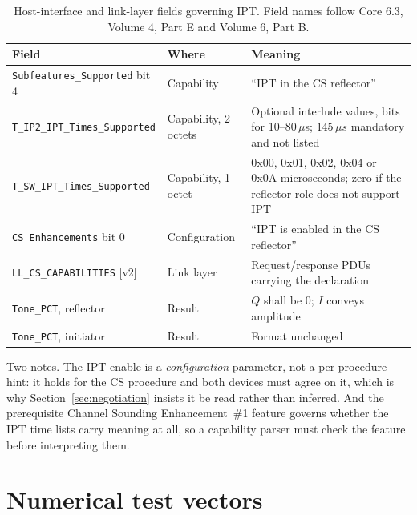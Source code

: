 \documentclass[11pt,a4paper]{article}
\newcommand{\us}{\,\ensuremath{\upmu}s}
\newcommand{\IPT}{\ensuremath{\mathrm{IPT}}}
\newcommand{\code}[1]{\texttt{\small #1}}
\providecommand{\upmu}{\mu}
\begin{document}
\begin{table}[h]
\caption{Host-interface and link-layer fields governing \IPT. Field names follow Core 6.3, Volume 4,
Part E and Volume 6, Part B.}
\label{tab:hci}
\centering\small
\begin{tabular}{@{}L{44mm}L{30mm}L{50mm}@{}}
\toprule
Field & Where & Meaning \\
\midrule
\code{Subfeatures\_Supported} bit 4 & Capability & ``IPT in the CS reflector'' \\
\code{T\_IP2\_IPT\_Times\_Supported} & Capability, 2 octets & Optional interlude values, bits for 10--80\us; $145\us$ mandatory and not listed \\
\code{T\_SW\_IPT\_Times\_Supported} & Capability, 1 octet & 0x00, 0x01, 0x02, 0x04 or 0x0A microseconds; zero if the reflector role does not support \IPT \\
\code{CS\_Enhancements} bit 0 & Configuration & ``IPT is enabled in the CS reflector'' \\
\code{LL\_CS\_CAPABILITIES} [v2] & Link layer & Request/response PDUs carrying the declaration \\
\code{Tone\_PCT}, reflector & Result & $Q$ shall be 0; $I$ conveys amplitude \\
\code{Tone\_PCT}, initiator & Result & Format unchanged \\
\bottomrule
\end{tabular}
\end{table}

Two notes. The \IPT{} enable is a \emph{configuration} parameter, not a per-procedure hint: it holds
for the CS procedure and both devices must agree on it, which is why Section~\ref{sec:negotiation}
insists it be read rather than inferred. And the prerequisite Channel Sounding Enhancement~\#1
feature governs whether the \IPT{} time lists carry meaning at all, so a capability parser must check
the feature before interpreting them.

\section{Numerical test vectors}
\end{document}
